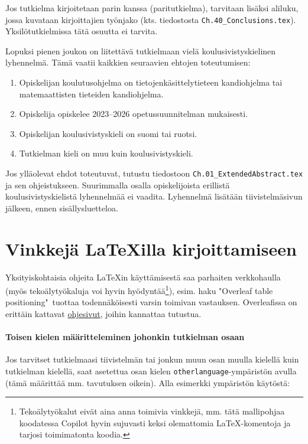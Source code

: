 \documentclass[finnish, manual, a4paper]{csthesis}
\begin{document}
Jos tutkielma kirjoitetaan parin kanssa (paritutkielma), tarvitaan lisäksi aliluku, jossa kuvataan kirjoittajien työnjako (kts. tiedostosta \texttt{Ch.40\_Conclusions.tex}). Yksilötutkielmissa tätä osuutta ei tarvita.

Lopuksi pienen joukon on liitettävä tutkielmaan vielä koulusivistyskielinen lyhennelmä. Tämä vaatii kaikkien seuraavien ehtojen toteutumisen:
\begin{enumerate}
    \item Opiskelijan koulutusohjelma on tietojenkäsittelytieteen kandiohjelma tai matemaattisten tieteiden kandiohjelma.
    \item Opiskelija opiskelee 2023--2026 opetussuunnitelman mukaisesti.
    \item Opiskelijan koulusivistyskieli on suomi tai ruotsi.
    \item Tutkielman kieli on muu kuin koulusivistyskieli.
\end{enumerate}
Jos ylläolevat ehdot toteutuvat, tutustu tiedostoon \texttt{Ch.01\_ExtendedAbstract.tex} ja sen ohjeistukseen. Suurimmalla osalla opiskelijoista erillistä koulusivistyskielistä lyhennelmää ei vaadita. Lyhennelmä lisätään tiivistelmäsivun jälkeen, ennen sisällysluetteloa. 

\section{Vinkkejä LaTeXilla kirjoittamiseen}\label{app:latexvinkit}

Yksityiskohtaisia ohjeita \LaTeX{}in käyttämisestä saa parhaiten verkkohaulla (myös tekoälytyökaluja voi hyvin hyödyntää\footnote{Tekoälytyökalut eivät aina anna toimivia vinkkejä, mm. tätä mallipohjaa koodatessa Copilot hyvin sujuvasti keksi olemattomia LaTeX-komentoja ja tarjosi toimimatonta koodia.}), esim. haku  "Overleaf table positioning"\ tuottaa todennäköisesti varsin toimivan vastauksen. Overleafissa on erittäin kattavat \href{https://www.overleaf.com/learn}{ohjesivut}, joihin kannattaa tutustua.

\paragraph{Toisen kielen määritteleminen johonkin tutkielman osaan}
Jos tarvitset tutkielmaasi tiivistelmän tai jonkun muun osan muulla kielellä kuin tutkielman kielellä, saat asetettua osan kielen \texttt{otherlanguage}-ym\-pä\-ris\-tön avulla (tämä määrittää mm. tavutuksen oikein). Alla esimerkki ympäristön käytöstä: 
\end{document}
